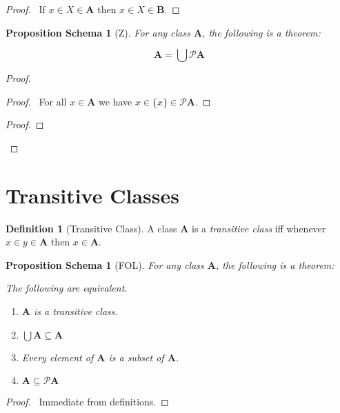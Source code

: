 \documentclass{book}
\let\qed\relax
\newtheorem{props}[ax]{Proposition Schema}
\theoremstyle{definition}
\newtheorem{df}[ax]{Definition}
\begin{document}
\begin{proof}
\pf\ If $x \in X \in \mathbf{A}$ then $x \in X \in \mathbf{B}$. \qed
\end{proof}

\begin{props}[Z]
\label{prop:UPA}
For any class $\mathbf{A}$, the following is a theorem:

\[ \mathbf{A} = \bigcup \mathcal{P} \mathbf{A} \]
\end{props}

\begin{proof}
\pf
{}
\begin{proof}
	\pf\ For all $x \in \mathbf{A}$ we have $x \in \{x\} \in \mathcal{P} \mathbf{A}$.
\end{proof}
\begin{proof}
\end{proof}
\qed
\end{proof}

\section{Transitive Classes}

\begin{df}[Transitive Class]
A class $\mathbf{A}$ is a \emph{transitive class} iff whenever $x \in y \in \mathbf{A}$ then $x \in \mathbf{A}$.
\end{df}

\begin{props}[FOL]
\label{prop:transitiveset}
For any class $\mathbf{A}$, the following is a theorem:

The following are equivalent.
\begin{enumerate}
\item
$\mathbf{A}$ is a transitive class.
\item
$\bigcup \mathbf{A} \subseteq \mathbf{A}$
\item
Every element of $\mathbf{A}$ is a subset of $\mathbf{A}$.
\item
$\mathbf{A} \subseteq \mathcal{P} \mathbf{A}$
\end{enumerate}
\end{props}

\begin{proof}
\pf\ Immediate from definitions. \qed
\end{proof}
\end{document}
